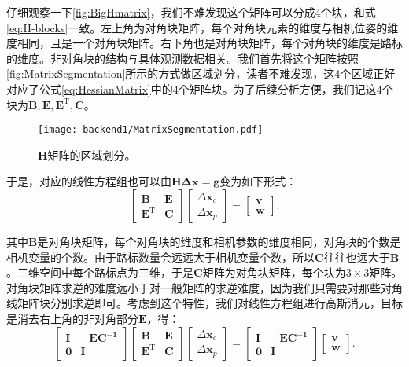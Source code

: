 仔细观察一下\autoref{fig:BigHmatrix}，我们不难发现这个矩阵可以分成4个块，和式\eqref{eq:H-blocks}一致。左上角为对角块矩阵，每个对角块元素的维度与相机位姿的维度相同，且是一个对角块矩阵。右下角也是对角块矩阵，每个对角块的维度是路标的维度。非对角块的结构与具体观测数据相关。我们首先将这个矩阵按照\autoref{fig:MatrixSegmentation}所示的方式做区域划分，读者不难发现，这4个区域正好对应了公式\eqref{eq:HessianMatrix}中的4个矩阵块。为了后续分析方便，我们记这4个块为$\bm{B}, \bm{E}, \bm{E}^\mathrm{T}, \bm{C}$。

\begin{figure}[!ht]
	\centering
	\texttt{[image: backend1/MatrixSegmentation.pdf]}
	\caption{$\bm{H}$矩阵的区域划分。}
	\label{fig:MatrixSegmentation}
\end{figure}

于是，对应的线性方程组也可以由$\bm{H\Delta x} = \bm{g}$变为如下形式：
\begin{equation}
\label{eq:linearequations}
 \left[ \begin{matrix}
\bm{B}   &   \bm{E} \\
\bm{E^\mathrm{T}} &   \bm{C}
\end{matrix}\right] 
\left[ \begin{array}{l}
\Delta \bm{x}_c \\
\Delta \bm{x}_p 
\end{array} \right] = 
\left[ \begin{array}{l}
\bm{v} \\
\bm{w} 
\end{array} \right].
\end{equation}

其中$\bm{B}$是对角块矩阵，每个对角块的维度和相机参数的维度相同，对角块的个数是相机变量的个数。由于路标数量会远远大于相机变量个数，所以$\bm{C}$往往也远大于$\bm{B}$。三维空间中每个路标点为三维，于是$\bm{C}$矩阵为对角块矩阵，每个块为$3 \times 3$矩阵。对角块矩阵求逆的难度远小于对一般矩阵的求逆难度，因为我们只需要对那些对角线矩阵块分别求逆即可。考虑到这个特性，我们对线性方程组进行高斯消元，目标是消去右上角的非对角部分$\bm{E}$，得：
\begin{equation}\label{eq:guasselimination}
\left[ \begin{matrix}
\bm{I}   &    -\bm{EC^{-1}} \\
\bm{0}	 &	  \bm{I}
\end{matrix}\right]
\left[ \begin{matrix}
\bm{B}   &   \bm{E} \\
\bm{E^\mathrm{T}} &   \bm{C}
\end{matrix}\right] 
\left[ \begin{array}{l}
\Delta \bm{x}_c \\
\Delta \bm{x}_p 
\end{array} \right] = 
\left[ \begin{matrix}
\bm{I}   &    -\bm{EC^{-1}}  \\
\bm{0}	 &	  \bm{I}
\end{matrix}
\right]
\left[ \begin{array}{l}
\bm{v} \\
\bm{w} 
\end{array} \right]  .
\end{equation}

